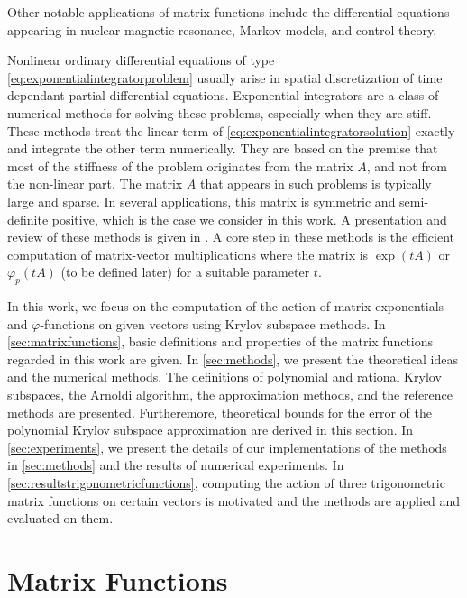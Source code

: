 Other notable applications of matrix functions include the differential equations
appearing in nuclear magnetic resonance, Markov models, and control theory.

Nonlinear ordinary differential equations of type \eqref{eq:exponentialintegratorproblem}
usually arise in spatial discretization of time dependant partial differential equations.
Exponential integrators are a class of numerical methods for solving these problems, especially
when they are stiff. These methods treat the linear term of \eqref{eq:exponentialintegratorsolution}
exactly and integrate the other term numerically. They are based on the premise that most of the
stiffness of the problem originates from the matrix $A$, and not from the non-linear part. The matrix
$A$ that appears in such problems is typically large and sparse. In several applications, this matrix
is symmetric and semi-definite positive, which is the case we consider in this work.
A presentation and review of these methods is given in \cite{minchev2005review}.
A core step in these methods is the efficient computation of matrix-vector multiplications where
the matrix is $\exp(tA)$ or $\varphi_p(tA)$ (to be defined later) for a suitable parameter $t$.

In this work, we focus on the computation of the action of matrix exponentials and
$\varphi$-functions on given vectors using Krylov subspace methods.
In \autoref{sec:matrixfunctions}, basic definitions and properties of the matrix functions
regarded in this work are given. In \autoref{sec:methods}, we present the theoretical ideas
and the numerical methods. The definitions of polynomial and rational Krylov subspaces,
the Arnoldi algorithm, the approximation methods, and the reference methods are presented.
Furtheremore, theoretical bounds for the error of the polynomial Krylov subspace approximation
are derived in this section. In \autoref{sec:experiments}, we present the details of our
implementations of the methods in \autoref{sec:methods} and the results of numerical experiments.
In \autoref{sec:resultstrigonometricfunctions}, computing the action of three trigonometric
matrix functions on certain vectors is motivated and the methods are applied and evaluated on them.

\section{Matrix Functions}
\label{sec:matrixfunctions}

